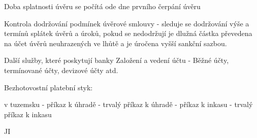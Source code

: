 Doba splatnosti úvěru se počítá ode dne prvního čerpání úvěru

Kontrola dodržování podmínek úvěrové smlouvy
- sleduje se dodržování výše a termínů splátek úvěrů a úroků, pokud se nedodržují je dlužná
částka převedena na účet úvěrů neuhrazených ve lhůtě a je úročena vyšší sankční sazbou.

Další služby, které poskytují banky
Založení a vedení účtu - Běžné účty, termínované účty, devizové účty atd.

Bezhotovostní platební styk:

v tuzemsku - příkaz k úhradě - trvalý příkaz k úhradě
- příkaz k inkasu - trvalý příkaz k inkasu

JI